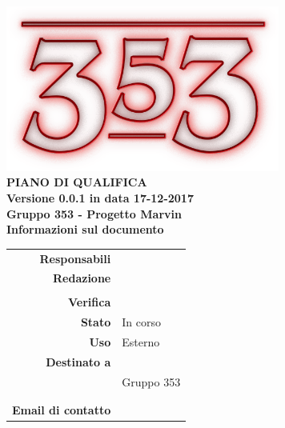 \documentclass[openany, a4paper, 12pt]{report}
\begin{document}
	
	\begin{titlepage}
		\centering
		\vfill
		{
			\bfseries
			\vskip2cm
			\includegraphics[width=9cm]{../../common/images/logo.png} \\
			\vfill
			\Huge{PIANO DI QUALIFICA}\\
			\vfill
			\Large Versione 0.0.1 in data 17-12-2017\\
			\large Gruppo 353 - Progetto Marvin\\
			\vfill
			\normalsize Informazioni sul documento\\
			\begin{table}[htbp]
				\centering
				\renewcommand\arraystretch{1.2}
				\begin{tabular}{r|l}
					\hline
					\textbf{Responsabili}	& \\
					\textbf{Redazione} 		& \Elena \\
					& \Parwinder \\
					\textbf{Verifica} 		& \\	
					
					\textbf{Stato} 			& In corso\\
					\textbf{Uso}			& Esterno\\
					\textbf{Destinato a}   	& \Proponente\\
					& Gruppo 353\\
					& \Vardanega\\
					& \Cardin\\
					
					\textbf{Email di contatto}	& \mailleaf
				\end{tabular}
			\end{table}
			\vfill
		}    
	\end{titlepage}
	
	\tableofcontents
	\listoffigures
	\listoftables
	\newpage

	
	
	
	
	
	
	
	
	
	
\end{document}
